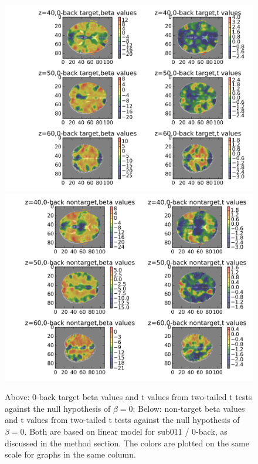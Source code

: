 \documentclass[11pt]{article}
\begin{document}
\begin{figure}
\centering
\includegraphics[scale=0.7]{../results/sub011_target_betas_0_back.png}
\includegraphics[scale=0.7]{../results/sub011_nontarget_betas_0_back.png}
\caption{Above: 0-back target beta values and t values from two-tailed t tests against the null hypothesis of $\beta = 0$; Below: non-target beta values and t values from two-tailed t tests against the null hypothesis of $\beta = 0$. Both are based on linear model for sub011 / 0-back, as discussed in the method section. The colors are plotted on the same scale for graphs in the same column.}
\end{figure}
\end{document}
